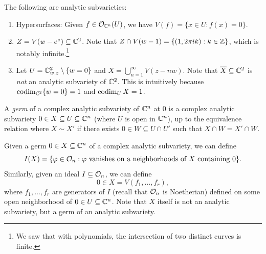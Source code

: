 \begin{example}
  The following are analytic subvarieties:
  \begin{enumerate}
    \item Hypersurfaces:
      Given $f \in \mathcal{O}_{\mathbb{C}^n}(U)$, we have
      $V(f) = \{x \in U : f(x) = 0\}$.
    \item $Z = V(w - e^z) \subseteq \mathbb{C}^2$.
      Note that $Z \cap V(w - 1) = \{(1, 2\pi i k) : k \in \mathbb{Z}\}$,
      which is notably infinite.\footnote{We saw that with polynomials, the intersection of two distinct curves is finite.}
    \item Let $U = \mathbb{C}_{w, z}^2 \setminus \{w = 0\}$
      and $X = \bigcup_{n = 1}^\infty V(z - nw)$.
      Note that
      $\overline{X} \subseteq \mathbb{C}^2$
      is \emph{not} an analytic subvariety of $\mathbb{C}^2$.
      This is intuitively because
      $\operatorname{codim}_{\mathbb{C}^2} \{w = 0\} = 1$ and
      $\operatorname{codim}_U X = 1$.
  \end{enumerate}
\end{example}

\begin{definition}
  A \emph{germ} of a complex analytic
  subvariety of $\mathbb{C}^n$ at $0$ is a complex
  analytic subvariety
  $0 \in X \subseteq U \subseteq \mathbb{C}^n$
  (where $U$ is open in $\mathbb{C}^n$), up to the
  equivalence relation where
  $X \sim X'$ if there exists
  $0 \in W \subseteq U \cap U'$ such that
  $X \cap W = X' \cap W$.
\end{definition}

\begin{remark}
  Given a germ $0 \in X \subseteq \mathbb{C}^n$ of
  a complex analytic subvariety, we can
  define
  \[
    I(X)
    = \{
      \varphi \in \mathcal{O}_n :
      \text{$\varphi$ vanishes on a neighborhoods of $X$ containing $0$}
    \}.
  \]
  Similarly, given an ideal $I \subseteq \mathcal{O}_n$,
  we can define
  \[
    0 \in X = V(f_1, \dots, f_r),
  \]
  where $f_1, \dots, f_r$ are generators
  of $I$ (recall that $\mathcal{O}_n$ is Noetherian)
  defined on some open neighborhood of
  $0 \in U \subseteq \mathbb{C}^n$.
  Note that $X$ itself is not an
  analytic subvariety, but a germ
  of an analytic subvariety.
\end{remark}

